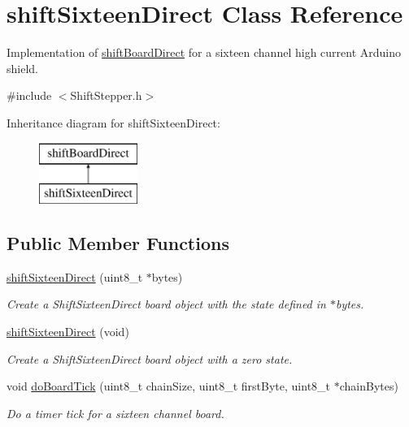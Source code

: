 \hypertarget{classshift_sixteen_direct}{
\section{shiftSixteenDirect Class Reference}
\label{classshift_sixteen_direct}
}


Implementation of \hyperlink{classshift_board_direct}{shiftBoardDirect} for a sixteen channel high current Arduino shield.  




{\ttfamily \#include $<$ShiftStepper.h$>$}

Inheritance diagram for shiftSixteenDirect:\begin{figure}[H]
\begin{center}
\leavevmode
\includegraphics[height=2.000000cm]{classshift_sixteen_direct}
\end{center}
\end{figure}
\subsection*{Public Member Functions}
\begin{DoxyCompactItemize}
\item 
\hyperlink{classshift_sixteen_direct_a3f0a9842d9e2c4e3e9cd08b9cc71c2fc}{shiftSixteenDirect} (uint8\_\-t $\ast$bytes)
\begin{DoxyCompactList}\small\item\em Create a ShiftSixteenDirect board object with the state defined in $\ast$bytes. \item\end{DoxyCompactList}\item 
\hyperlink{classshift_sixteen_direct_acea0239884a63a8a23dc2fac9c5a4e32}{shiftSixteenDirect} (void)
\begin{DoxyCompactList}\small\item\em Create a ShiftSixteenDirect board object with a zero state. \item\end{DoxyCompactList}\item 
void \hyperlink{classshift_sixteen_direct_a5b21bfddb73f49eb6743b335db18b066}{doBoardTick} (uint8\_\-t chainSize, uint8\_\-t firstByte, uint8\_\-t $\ast$chainBytes)
\begin{DoxyCompactList}\small\item\em Do a timer tick for a sixteen channel board. \item\end{DoxyCompactList}\end{DoxyCompactItemize}


